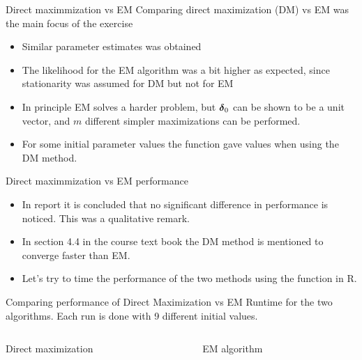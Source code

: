 \begin{frame}{Direct maximmization vs EM}
    Comparing direct maximization (DM) vs EM was the main focus of the exercise
    \begin{itemize}
        \item Similar parameter estimates was obtained
        \item The likelihood for the EM algorithm was a bit higher as expected, since stationarity was assumed for DM but not for EM
        \item In principle EM solves a harder problem, but $\boldsymbol{\delta}_0$ can be shown to be a unit vector, and $m$ different simpler maximizations can be performed.
        \item For some initial parameter values the  function gave  values when using the DM method.
    \end{itemize}
\end{frame}

\begin{frame}{Direct maximmization vs EM performance}
    \begin{itemize}
        \item In report it is concluded that no significant difference in performance is noticed. This was a qualitative remark.
        \item In section 4.4 in the course text book the DM method is mentioned to converge faster than EM.
        \item Let's try to time the performance of the two methods using the  function in R.
    \end{itemize}
\end{frame}

\begin{frame}{Comparing performance of Direct Maximization vs EM}
    Runtime for the two algorithms. Each run is done with 9 different initial values.
    \begin{columns}[t]
        \begin{column}{5cm}
            Direct maximization
            
            
            
        \end{column}
        \begin{column}{5cm}
            EM algorithm
            
            
            
        \end{column}
    \end{columns}
\end{frame}

